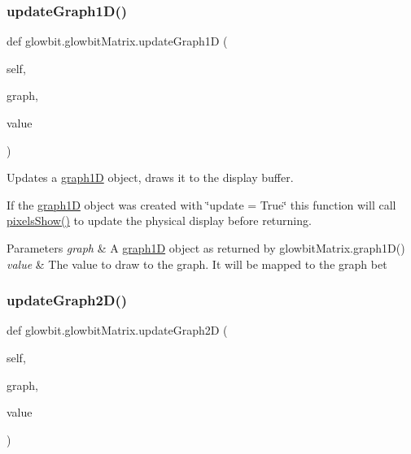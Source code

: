 \subsubsection{\texorpdfstring{update\+Graph1\+D()}{updateGraph1D()}}
{\footnotesize\ttfamily def glowbit.\+glowbit\+Matrix.\+update\+Graph1D (\begin{DoxyParamCaption}\item[{}]{self,  }\item[{}]{graph,  }\item[{}]{value }\end{DoxyParamCaption})}



Updates a \hyperlink{classglowbit_1_1glowbitMatrix_1_1graph1D}{graph1D} object, draws it to the display buffer. 

If the \hyperlink{classglowbit_1_1glowbitMatrix_1_1graph1D}{graph1D} object was created with \char`\"{}update = True\char`\"{} this function will call \hyperlink{classglowbit_1_1glowbit_a051aed2a4969fdcb0466e4e840209279}{pixels\+Show()} to update the physical display before returning.


\begin{DoxyParams}{Parameters}
{\em graph} & A \hyperlink{classglowbit_1_1glowbitMatrix_1_1graph1D}{graph1D} object as returned by glowbit\+Matrix.\+graph1\+D() \\
\hline
{\em value} & The value to draw to the graph. It will be mapped to the graph bet \\
\hline
\end{DoxyParams}
\mbox{\label{classglowbit_1_1glowbitMatrix_ae9083babec0d5004363782540b60baed}} 
\subsubsection{\texorpdfstring{update\+Graph2\+D()}{updateGraph2D()}}
{\footnotesize\ttfamily def glowbit.\+glowbit\+Matrix.\+update\+Graph2D (\begin{DoxyParamCaption}\item[{}]{self,  }\item[{}]{graph,  }\item[{}]{value }\end{DoxyParamCaption})}



